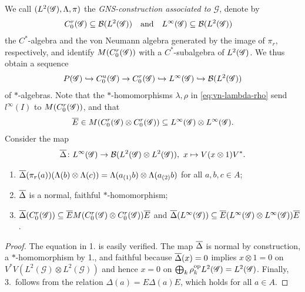 We call $(L^{2}(\mathscr{G}),\Lambda,\pi)$ the \emph{GNS-construction associated
  to $\mathscr{G}$}, denote by
\begin{align}
  C^{r}_{0}(\mathscr{G}) &\subseteq {\cal B}(L^{2}(\mathscr{G})) &&\text{and} & L^{\infty}(\mathscr{G}) &\subseteq {\cal B}(L^{2}(\mathscr{G}))
\end{align}
the $C^{*}$-algebra and the von Neumann algebra generated by the image
of $\pi_{r}$, respectively, and identify $M(C^{r}_{0}(\mathscr{G}))$ with a
$C^{*}$-subalgebra of $L^{2}(\mathscr{G})$.  We thus obtain a sequence
\begin{align*}
P(\mathscr{G}) \hookrightarrow C^{u}_{0}(\mathscr{G}) \to
  C^{r}_{0}(\mathscr{G})\hookrightarrow
L^{\infty}(\mathscr{G}) \hookrightarrow {\cal B}(L^{2}(\mathscr{G}))
\end{align*}
of $*$-algebras.
Note that
 the $*$-homomorphisms $\lambda,\rho$ in
\eqref{eq:vn-lambda-rho} send $l^{\infty}(I)$ to $M(C^{r}_{0}(\mathscr{G}))$, and that
\begin{align*}
  \overline{E} \in M(C^{r}_{0}(\mathscr{G}) \otimes C^{r}_{0}(\mathscr{G})) \subseteq L^{\infty}(\mathscr{G}) \otimes L^{\infty}(\mathscr{G}).
\end{align*}
Consider the map 
\begin{align*}
  \overline{\Delta} \colon L^{\infty}(\mathscr{G}) \to {\cal B}(L^{2}(\mathscr{G}) \otimes L^{2}(\mathscr{G})), \ x
  \mapsto V(x \otimes 1)V^{*}.
\end{align*}
\begin{Lem} \label{lemma:vn-delta}
  \begin{enumerate}
  \item $\overline{\Delta}(\pi_{r}(a)) (\Lambda(b) \otimes \Lambda(c)) =
    \Lambda(a_{(1)}b) \otimes \Lambda(a_{(2)}b)$ for all $a,b,c\in A$;
  \item $\overline{\Delta}$ is a normal, faithful $*$-homomorphism;
  \item  $\overline{\Delta}(C^{r}_{0}(\mathscr{G})) \subseteq \overline{E} M(C^{r}_{0}(\mathscr{G}) \otimes
  C^{r}_{0}(\mathscr{G}))\overline{E}$ and $\overline{\Delta}(L^{\infty}(\mathscr{G})) \subseteq \overline{E}(L^{\infty}(\mathscr{G}) \otimes
  L^{\infty}(\mathscr{G}))\overline{E}$.
  \end{enumerate}
\end{Lem}
\begin{proof}
  The equation in 1.{} is easily verified. The map $\overline{\Delta}$ is
  normal by construction, a $*$-homo\-morphism by 1.{}, and faithful
  because $\overline{\Delta}(x)=0$ implies $x\otimes 1=0$ on
  $V^{*}V(L^{2}(\mathscr{G}) \otimes L^{2}(\mathscr{G}))$ and hence
  $x=0$ on $\bigoplus_{k}
  \rho_{k}^{\operatorname{\mathrm{op}}}L^{2}(\mathscr{G})=L^{2}(\mathscr{G})$. Finally, 3.\
  follows from the relation $\Delta(a)=E\Delta(a)E$, which holds for
  all $a\in A$.
\end{proof}


